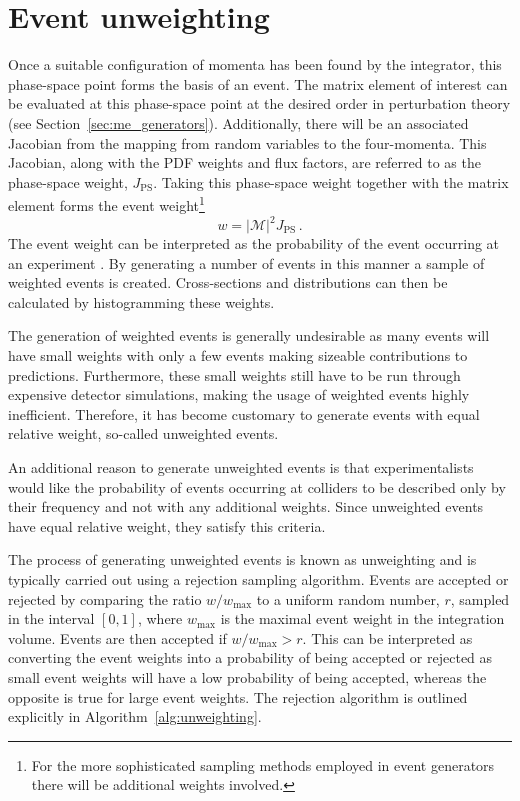 \documentclass[main.tex]{subfiles}
\begin{document}
    \section{Event unweighting}\label{sec:unweighting}
    Once a suitable configuration of momenta
    has been found by the integrator, this phase-space point forms the basis of an
    event. The matrix element of interest can be evaluated at
    this phase-space point at the desired order in perturbation
    theory (see Section~\ref{sec:me_generators}).
    Additionally, there will be an associated Jacobian
    from the mapping from random variables to the four-momenta.
    This Jacobian, along with the PDF weights and flux factors,
    are referred to as the phase-space weight, $J_{\mathrm{PS}}$. Taking
    this phase-space weight together
    with the matrix element forms the event weight\footnote{For
    the more sophisticated sampling methods employed in event generators
    there will be additional weights involved.}
    \begin{equation}\label{eqn:event_weight}
        w = |\mathcal{M}|^{2} J_{\mathrm{PS}} \, .
    \end{equation}
    The event weight can be interpreted as the probability
    of the event occurring at an experiment \cite{Plehn:2009nd}.
    By generating a number of events in this manner
    a sample of weighted events is created. Cross-sections
    and distributions can then be calculated by histogramming
    these weights.
    
    The generation of weighted events is generally undesirable
    as many events will have small weights with only a few events
    making sizeable contributions to predictions. Furthermore,
    these small weights still have to be run through expensive detector
    simulations, making the usage of weighted events highly inefficient.
    Therefore, it has become customary to generate events
    with equal relative weight, so-called unweighted events.

    An additional reason to generate unweighted events is that
    experimentalists would like the probability of events occurring
    at colliders to be described only by their frequency and not
    with any additional weights. Since unweighted events have
    equal relative weight, they satisfy this criteria.

    The process of generating unweighted events is known as
    unweighting and is typically carried out using a rejection
    sampling algorithm.
    Events are accepted or rejected by comparing the ratio
    $w / w_{\mathrm{max}}$ to a uniform random number, $r$,
    sampled in the interval $[0, 1]$, where $w_{\mathrm{max}}$ is
    the maximal event weight in the integration volume.
    Events are then accepted if $w / w_{\mathrm{max}} > r$.
    This can be interpreted as converting the event weights
    into a probability of being accepted or rejected as
    small event weights will have a low probability of being
    accepted, whereas the opposite is true for large event weights.
    The rejection algorithm is outlined explicitly in
    Algorithm~\ref{alg:unweighting}.
\end{document}
